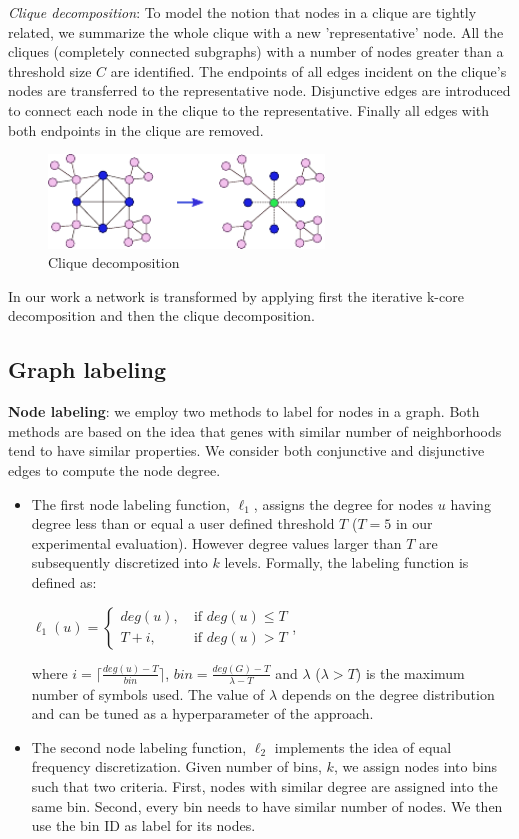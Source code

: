 \textit{Clique decomposition}: To model the notion that nodes in a clique are tightly related, we summarize the whole clique with a new 'representative' node. All the cliques (completely connected subgraphs) with a number of nodes greater than a threshold size $C$ are identified. The endpoints of all edges incident on the clique's nodes are transferred to the representative node. Disjunctive edges are introduced to connect each node in the clique to the representative. Finally all edges with both endpoints in the clique are removed.
\begin{figure}[ht]
\includegraphics[width=0.9\columnwidth, height=2.5cm]{img/cliques.pdf}
\caption{Clique decomposition}
\label{fig:01}
\end{figure}
In our work a network is transformed by applying first the iterative k-core decomposition and then the clique decomposition.

\subsection*{Graph labeling}
\textbf{Node labeling}: we employ two methods to label for nodes in a graph. Both methods are based on the idea that genes with similar number of neighborhoods tend to have similar properties. We consider both conjunctive and disjunctive edges to compute the node degree.
\begin{itemize}
\item The first node labeling function, $\ell_1$, assigns the degree for nodes $u$ having degree less than or equal a user defined threshold $T$ ($T=5$ in our experimental evaluation). However degree values larger than $T$ are subsequently discretized into $k$ levels. Formally, the labeling function is defined as:
\begin{center}
$\ell_1(u) = \left\{
	\begin{array}{ll}
		deg(u),\  & \mbox{if } deg(u) \leq T \\
		T+i,\ & \mbox{if } deg(u) > T
	\end{array}
\right.$,
\end{center}
where $i = \lceil \frac{deg(u)-T}{bin}\rceil$, $bin = \frac{deg(G)-T}{\lambda - T}$ and $\lambda$ ($\lambda > T$) is the maximum number of symbols used. The value of $\lambda$ depends on the degree distribution and can be tuned as a hyperparameter of the approach.

\item The second node labeling function, $\ell_2$ implements the idea of equal frequency discretization. Given number of bins, $k$, we assign nodes into bins such that two criteria. First, nodes with similar degree are assigned into the same bin. Second, every bin needs to have similar number of nodes. We then use the bin ID as label for its nodes.
\end{itemize}

